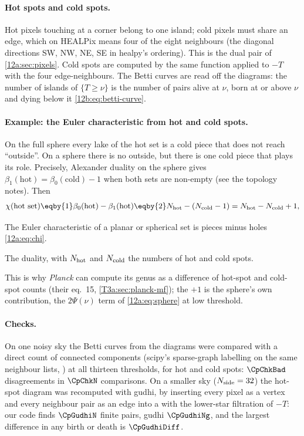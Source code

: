 \paragraph{Hot spots and cold spots.} Hot pixels touching at a corner belong to one island; cold pixels must share an edge, which on
HEALPix means four of the eight neighbours (the diagonal directions SW, NW, NE, SE in healpy's ordering). This is the dual pair of
\cref{12a:sec:pixels}. Cold spots are computed by the same function applied to $-T$ with the four edge-neighbours. The Betti curves
are read off the diagrams: the number of islands of $\{T\ge\nu\}$ is the number of pairs alive at $\nu$, born at or above $\nu$ and dying
below it \eqref{12b:eq:betti-curve}.

\paragraph{Example: the Euler characteristic from hot and cold spots.} On the full sphere every lake of the hot set is a cold piece
that does not reach ``outside''. On a sphere there is no outside, but there is one cold piece that plays its role. Precisely, Alexander
duality on the sphere gives $\beta_1(\text{hot})=\beta_0(\text{cold})-1$ when both sets are non-empty (see the topology notes). Then
\begin{align}
  \chi(\text{hot set})
  \eqby{1}\beta_0(\text{hot})-\beta_1(\text{hot})
  \eqby{2}N_{\rm hot}-(N_{\rm cold}-1)
  =N_{\rm hot}-N_{\rm cold}+1 ,
  \label{12c:eq:chi-hotcold}
\end{align}
\begin{explain}
  \item The Euler characteristic of a planar or spherical set is pieces minus holes \eqref{12a:eq:chi}.
  \item The duality, with $N_{\rm hot}$ and $N_{\rm cold}$ the numbers of hot and cold spots.
\end{explain}
This is why \textit{Planck} can compute its genus as a difference of hot-spot and cold-spot counts \cite{Planck2018VII} (their eq.~15,
\cref{T3a:sec:planck-mf}); the $+1$ is the sphere's own contribution, the $2\Psi(\nu)$ term of \eqref{12a:eq:sphere} at low threshold.

\paragraph{Checks.} On one noisy sky the Betti curves from the diagrams were compared with a direct count of connected components
(scipy's sparse-graph labelling on the same neighbour lists, ) at all thirteen thresholds, for hot and
cold spots: $\CpChkBad$ disagreements in $\CpChkN$ comparisons. On a smaller sky ($N_{\rm side}=32$) the hot-spot diagram was recomputed
with gudhi, by inserting every pixel as a vertex and every neighbour pair as an edge into a  with the lower-star
filtration of $-T$: our code finds $\CpGudhiN$ finite pairs, gudhi $\CpGudhiNg$, and the largest difference in any birth or death is
$\CpGudhiDiff$.

